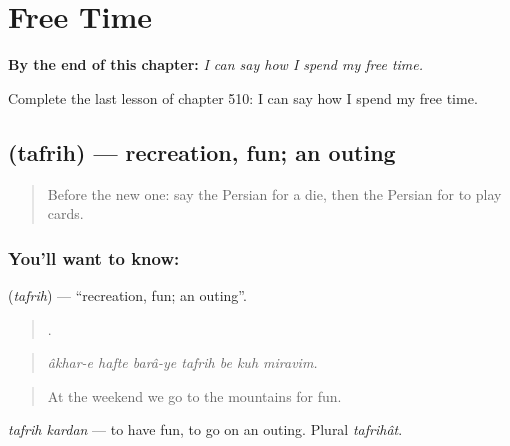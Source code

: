
\chapter{Free Time}
\label{ch:fa-free-time}

\begin{chapteropening}
\textbf{By the end of this chapter:} \emph{I can say how I spend my free time.}

Complete the last lesson of chapter 510: I can say how I spend my free time.
\end{chapteropening}

\section[\texorpdfstring{\fa{تفریح} (tafrih)}{تفریح (tafrih)}]{ (tafrih) — recreation, fun; an outing}

\label{lesson:FA-C510-tafrih}



\begin{quote}
Before the new one: say the Persian for a die, then the Persian for to play cards.
\end{quote}

\subsection*{You'll want to know: }
\textbf{} (\emph{tafrih}) — \textquotedblleft{}recreation, fun; an outing\textquotedblright{}.

\begin{quote}
      .
\end{quote}

\begin{quote}
\emph{âkhar-e hafte barâ-ye tafrih be kuh miravim.}
\end{quote}

\begin{quote}
At the weekend we go to the mountains for fun.
\end{quote}

\emph{tafrih kardan} — to have fun, to go on an outing. Plural \emph{tafrihât}.

